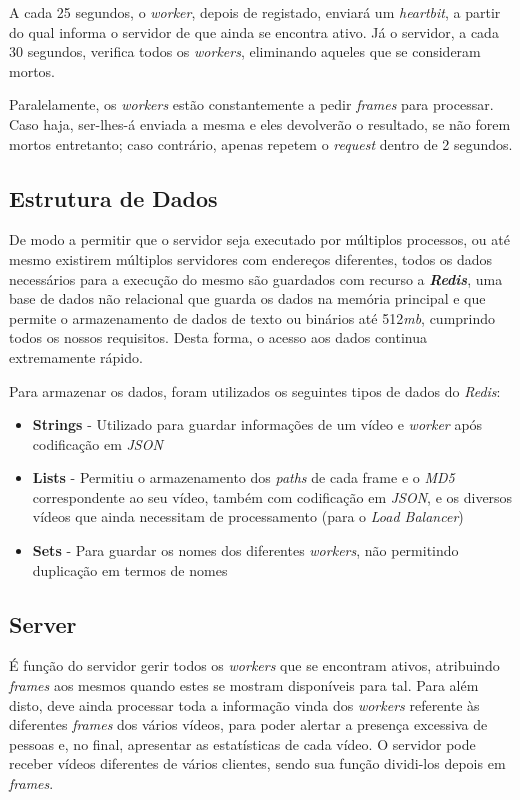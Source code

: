 \documentclass[10pt,portuguese]{article}
\begin{document}
\par A cada 25 segundos, o \textit{worker}, depois de registado, enviará um \textit{heartbit}, a partir do qual informa o servidor de que ainda se encontra ativo. Já o servidor, a cada 30 segundos, verifica todos os \textit{workers}, eliminando aqueles que se consideram mortos.
\par Paralelamente, os \textit{workers} estão constantemente a pedir \textit{frames} para processar. Caso haja, ser-lhes-á enviada a mesma e eles devolverão o resultado, se não forem mortos entretanto; caso contrário, apenas repetem o \textit{request} dentro de 2 segundos. 

\subsection{Estrutura de Dados}

\par De modo a permitir que o servidor seja executado por múltiplos processos, ou até mesmo existirem múltiplos servidores com endereços diferentes, todos os dados necessários para a execução do mesmo são guardados com recurso a \textbf{\textit{Redis}}, uma base de dados não relacional que guarda os dados na memória principal e que permite o armazenamento de dados de texto ou binários até 512\textit{mb}, cumprindo todos os nossos requisitos. Desta forma, o acesso aos dados continua extremamente rápido.

\par Para armazenar os dados, foram utilizados os seguintes tipos de dados do \textit{Redis}:

 \begin{itemize}
     \item \textbf{Strings} - Utilizado para guardar informações de um vídeo e \textit{worker} após codificação em \textit{JSON}
     \item \textbf{Lists} - Permitiu o armazenamento dos \textit{paths} de cada frame e o \textit{MD5} correspondente ao seu vídeo, também com codificação em \textit{JSON}, e os diversos vídeos que ainda necessitam de processamento (para o \textit{Load Balancer})
     \item \textbf{Sets} - Para guardar os nomes dos diferentes \textit{workers}, não permitindo duplicação em termos de nomes
 \end{itemize}
 
\subsection{Server}
\par É função do servidor gerir todos os \textit{workers} que se encontram ativos, atribuindo \textit{frames} aos mesmos quando estes se mostram disponíveis para tal. Para além disto, deve ainda processar toda a informação vinda dos \textit{workers} referente às diferentes \textit{frames} dos vários vídeos, para poder alertar a presença excessiva de pessoas e, no final, apresentar as estatísticas de cada vídeo. O servidor pode receber vídeos diferentes de vários clientes, sendo sua função dividi-los depois em \textit{frames}.
\end{document}
